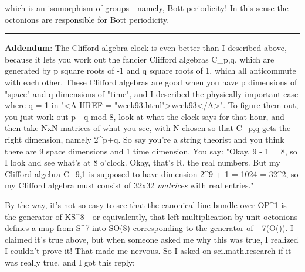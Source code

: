 which is an isomorphism of groups - namely, Bott periodicity!
In this sense the octonions are responsible for Bott periodicity.
\par\noindent\rule{\textwidth}{0.4pt}
\textbf{Addendum}: The Clifford algebra clock is even better than I described
above, because it lets you work out the fancier Clifford algebras
C_{p,q}, which are generated by p square roots of -1 and q square
roots of 1, which all anticommute with each other.  These Clifford
algebras are good when you have p dimensions of "space" and q
dimensions of "time", and I described the physically important case
where q = 1 in "<A HREF = "week93.html">week93</A>".  To figure them 
out, you just work out p - q
mod 8, look at what the clock says for that hour, and then take NxN
matrices of what you see, with N chosen so that C_{p,q} gets the right
dimension, namely 2^{p+q}.  So say you're a string theorist and you
think there are 9 space dimensions and 1 time dimension.  You say:
"Okay, 9 - 1 = 8, so I look and see what's at 8 o'clock.  Okay, that's
R, the real numbers.  But my Clifford algebra C_{9,1} is supposed to 
have dimension 2^{9 + 1} = 1024 = 32^{2}, so my Clifford 
algebra must consist of 32x32 \emph{matrices} with real entries."

By the way, it's not so easy to see that the canonical line bundle
over OP^{1} is the generator of KS^{8} - or equivalently, 
that left multiplication
by unit octonions defines a map from S^{7} into SO(8) corresponding 
to the generator of \pi _{7}(O(\infty )).  I claimed it's 
true above, but when someone 
asked me why this was true, I realized I couldn't prove it!  That made me 
nervous.  So I asked on sci.math.research if it was really true, and I got 
this reply:


